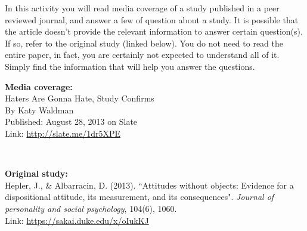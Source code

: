 \documentclass[12pt]{article}
\begin{document}
\begin{minipage}[c]{0.72\textwidth}
In this activity you will read media coverage of a study published in a peer reviewed 
journal, and answer a few of question about a study. It is possible that the article 
doesn't provide the relevant information to answer certain question(s). If so, refer 
to the original study (linked below). You do not need to read the entire paper, in fact, 
you are certainly not expected to understand all of it. Simply find the information that 
will help you answer the questions. \\

\begin{minipage}[t]{0.49\textwidth}
\textbf{Media coverage:} \\
{\small
Haters Are Gonna Hate, Study Confirms \\
By  Katy Waldman \\
Published: August 28, 2013 on Slate \\
Link: \url{http://slate.me/1dr5XPE} \\
}
\end{minipage}
\begin{minipage}[t]{0.02\textwidth}
$\:$ \\
\end{minipage}
\begin{minipage}[t]{0.49\textwidth}
\textbf{Original study:} \\
{\small
Hepler, J., \& Albarracin, D. (2013). ``Attitudes without objects: Evidence for a 
dispositional attitude, its measurement, and its consequences". \textit{Journal of 
personality and social psychology}, 104(6), 1060. \\
Link: \url{https://sakai.duke.edu/x/oIukKJ} \\
}
\end{minipage}

\end{minipage}
\begin{minipage}[c]{0.03\textwidth}
$\:$ \\
\end{minipage}
\end{document}
